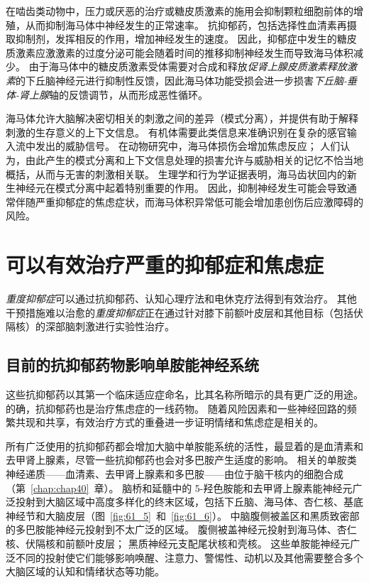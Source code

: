 在啮齿类动物中，压力或厌恶的治疗或糖皮质激素的施用会抑制颗粒细胞前体的增殖，从而抑制海马体中神经发生的正常速率。
抗抑郁药，包括选择性血清素再摄取抑制剂，发挥相反的作用，增加神经发生的速度。
因此，抑郁症中发生的糖皮质激素应激激素的过度分泌可能会随着时间的推移抑制神经发生而导致海马体积减少。
由于海马体中的糖皮质激素受体需要对合成和释放\textit{促肾上腺皮质激素释放激素}的下丘脑神经元进行抑制性反馈，因此海马体功能受损会进一步损害\textit{下丘脑-垂体-肾上腺}轴的反馈调节，从而形成恶性循环。


海马体允许大脑解决密切相关的刺激之间的差异（模式分离），并提供有助于解释刺激的生存意义的上下文信息。
有机体需要此类信息来准确识别在复杂的感官输入流中发出的威胁信号。
在动物研究中，海马体损伤会增加焦虑反应；
人们认为，由此产生的模式分离和上下文信息处理的损害允许与威胁相关的记忆不恰当地概括，从而与无害的刺激相关联。
生理学和行为学证据表明，海马齿状回内的新生神经元在模式分离中起着特别重要的作用。
因此，抑制神经发生可能会导致通常伴随严重抑郁症的焦虑症状，而海马体积异常低可能会增加患创伤后应激障碍的风险。



\section{可以有效治疗严重的抑郁症和焦虑症}

\textit{重度抑郁症}可以通过抗抑郁药、认知心理疗法和电休克疗法得到有效治疗。
其他干预措施难以治愈的\textit{重度抑郁症}正在通过针对膝下前额叶皮层和其他目标（包括伏隔核）的深部脑刺激进行实验性治疗。



\subsection{目前的抗抑郁药物影响单胺能神经系统}

这些抗抑郁药以其第一个临床适应症命名，比其名称所暗示的具有更广泛的用途。
的确，抗抑郁药也是治疗焦虑症的一线药物。
随着风险因素和一些神经回路的频繁共现和共享，有效治疗方式的重叠进一步证明情绪和焦虑症是相关的。


所有广泛使用的抗抑郁药都会增加大脑中单胺能系统的活性，最显着的是血清素和去甲肾上腺素，尽管一些抗抑郁药也会对多巴胺产生适度的影响。
相关的单胺类神经递质——血清素、去甲肾上腺素和多巴胺——由位于脑干核内的细胞合成（第~\ref{chap:chap40}~章）。
脑桥和延髓中的 5-羟色胺能和去甲肾上腺素能神经元广泛投射到大脑区域中高度多样化的终末区域，包括下丘脑、海马体、杏仁核、基底神经节和大脑皮层（图~\ref{fig:61_5}~和~\ref{fig:61_6}）。
中脑腹侧被盖区和黑质致密部的多巴胺能神经元投射到不太广泛的区域。
腹侧被盖神经元投射到海马体、杏仁核、伏隔核和前额叶皮层；
黑质神经元支配尾状核和壳核。
这些单胺能神经元广泛不同的投射使它们能够影响唤醒、注意力、警惕性、动机以及其他需要整合多个大脑区域的认知和情绪状态等功能。


